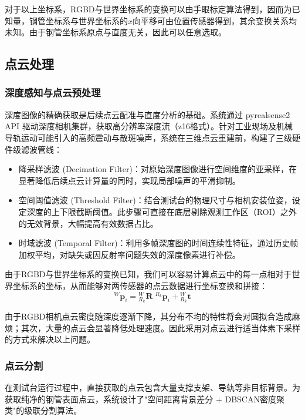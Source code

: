 \documentclass{article}
\begin{document}
对于以上坐标系，RGBD与世界坐标系的变换可以由手眼标定算法得到，因而为已知量，钢管坐标系与世界坐标系的$x$向平移可由位置传感器得到，其余变换关系均未知。由于钢管坐标系原点与直度无关，因此可以任意选取。

\subsection{点云处理}

\subsubsection{深度感知与点云预处理}

深度图像的精确获取是后续点云配准与直度分析的基础。系统通过 pyrealsense2 API 驱动深度相机集群，获取高分辨率深度流（z16格式）。针对工业现场及机械导轨运动可能引入的高频震动与散斑噪声，系统在三维点云重建前，构建了三级硬件级滤波管线：
\begin{itemize}
\item 降采样滤波 (Decimation Filter)：对原始深度图像进行空间维度的亚采样，在显著降低后续点云计算量的同时，实现局部噪声的平滑抑制。
\item 空间阈值滤波 (Threshold Filter)：结合测试台的物理尺寸与相机安装位姿，设定深度的上下限截断阈值。此步骤可直接在底层剔除观测工作区（ROI）之外的无效背景，大幅提高有效数据占比。
\item 时域滤波 (Temporal Filter)：利用多帧深度图的时间连续性特征，通过历史帧加权平均，对缺失或因反射率问题失效的深度像素进行补偿。
\end{itemize}

由于RGBD与世界坐标系的变换已知，我们可以容易计算点云中的每一点相对于世界坐标系的坐标，从而能够对两传感器的点云数据进行坐标变换和拼接：
\begin{equation}
    {}^W\mathbf{p}_i = {}^W_{R_k}\mathbf{R} \; {}^{R_k}\mathbf{p}_i + {}^W_{R_k}\mathbf{t}
\end{equation}

由于RGBD相机点云密度随深度逐渐下降，其分布不均的特性将会对圆拟合造成麻烦；其次，大量的点云会显著降低处理速度。因此采用对点云进行适当体素下采样的方式来解决以上问题。

\subsubsection{点云分割}

在测试台运行过程中，直接获取的点云包含大量支撑支架、导轨等非目标背景。为获取纯净的钢管表面点云，系统设计了"空间距离背景差分 + DBSCAN密度聚类"的级联分割算法。
\end{document}
